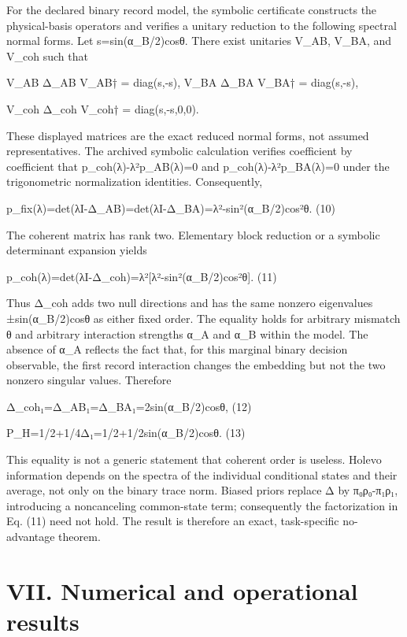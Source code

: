 \documentclass[
]{article}
\begin{document}
For the declared binary record model, the symbolic certificate
constructs the physical-basis operators and verifies a unitary reduction
to the following spectral normal forms. Let s=sin(α\_B/2)cosθ. There
exist unitaries V\_AB, V\_BA, and V\_coh such that

V\_AB Δ\_AB V\_AB† = diag(s,-s), V\_BA Δ\_BA V\_BA† = diag(s,-s),

V\_coh Δ\_coh V\_coh† = diag(s,-s,0,0).

These displayed matrices are the exact reduced normal forms, not assumed
representatives. The archived symbolic calculation verifies coefficient
by coefficient that p\_coh(λ)-λ²p\_AB(λ)=0 and p\_coh(λ)-λ²p\_BA(λ)=0
under the trigonometric normalization identities. Consequently,

p\_fix(λ)=det(λI-Δ\_AB)=det(λI-Δ\_BA)=λ²-sin²(α\_B/2)cos²θ. (10)

The coherent matrix has rank two. Elementary block reduction or a
symbolic determinant expansion yields

p\_coh(λ)=det(λI-Δ\_coh)=λ²{[}λ²-sin²(α\_B/2)cos²θ{]}. (11)

Thus Δ\_coh adds two null directions and has the same nonzero
eigenvalues ±\textbar sin(α\_B/2)cosθ\textbar{} as either fixed order.
The equality holds for arbitrary mismatch θ and arbitrary interaction
strengths α\_A and α\_B within the model. The absence of α\_A reflects
the fact that, for this marginal binary decision observable, the first
record interaction changes the embedding but not the two nonzero
singular values. Therefore

\textbar\textbar Δ\_coh\textbar\textbar₁=\textbar\textbar Δ\_AB\textbar\textbar₁=\textbar\textbar Δ\_BA\textbar\textbar₁=2\textbar sin(α\_B/2)cosθ\textbar,
(12)

P\_H=1/2+1/4\textbar\textbar Δ\textbar\textbar₁=1/2+1/2\textbar sin(α\_B/2)cosθ\textbar.
(13)

This equality is not a generic statement that coherent order is useless.
Holevo information depends on the spectra of the individual conditional
states and their average, not only on the binary trace norm. Biased
priors replace Δ by π₀ρ₀-π₁ρ₁, introducing a noncanceling common-state
term; consequently the factorization in Eq. (11) need not hold. The
result is therefore an exact, task-specific no-advantage theorem.

\section{VII. Numerical and operational
results}\label{vii.-numerical-and-operational-results}
\end{document}
